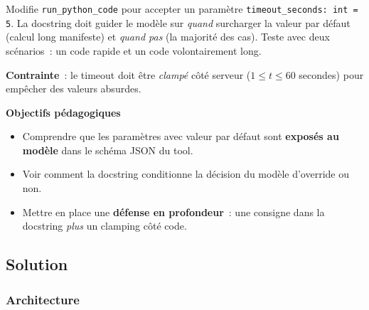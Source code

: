\documentclass[11pt,a4paper]{article}
\begin{document}
\begin{tcolorbox}[title=Exercice bonus 3. Exposer un paramètre par défaut au modèle]
Modifie \texttt{run\_python\_code} pour accepter un paramètre
\texttt{timeout\_seconds: int = 5}. La docstring doit guider le modèle
sur \emph{quand} surcharger la valeur par défaut (calcul long manifeste)
et \emph{quand pas} (la majorité des cas). Teste avec deux scénarios~:
un code rapide et un code volontairement long.

\textbf{Contrainte}~: le timeout doit être \emph{clampé} côté serveur
($1 \leq t \leq 60$ secondes) pour empêcher des valeurs absurdes.

\bigskip
\noindent\textbf{Objectifs pédagogiques}
\begin{itemize}[leftmargin=*]
  \item Comprendre que les paramètres avec valeur par défaut sont
        \textbf{exposés au modèle} dans le schéma JSON du tool.
  \item Voir comment la docstring conditionne la décision du modèle
        d'override ou non.
  \item Mettre en place une \textbf{défense en profondeur}~: une
        consigne dans la docstring \emph{plus} un clamping côté code.
\end{itemize}
\end{tcolorbox}

\subsection{Solution}

\subsubsection{Architecture}

\begin{center}
\end{center}
\end{document}
